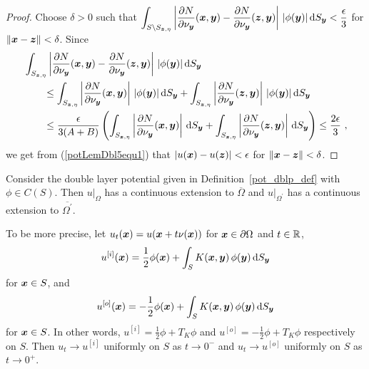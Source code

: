 \begin{proof}
Choose $\delta > 0$ such that
$\displaystyle
\int_{S \setminus S_{{\bm{z}},\eta}} \left| \frac{\partial{N}}{\partial \nu_{{\bm{y}}}}
({\bm{x}},{\bm{y}}) - \frac{\partial{N}}{\partial \nu_{{\bm{y}}}} ({\bm{z}},{\bm{y}})
\right|\,|\phi({\bm{y}})| \,\mathrm{d}{S}_{{\bm{y}}} < \frac{\epsilon}{3}$ for
$\|{\bm{x}} - {\bm{z}}\| < \delta$.
Since
\begin{align*}
&\int_{S_{{\bm{z}},\eta}}
\left| \frac{\partial{N}}{\partial \nu_{{\bm{y}}}} ({\bm{x}},{\bm{y}})
- \frac{\partial{N}}{\partial \nu_{{\bm{y}}}} ({\bm{z}},{\bm{y}}) \right|\,
|\phi({\bm{y}})| \,\mathrm{d}{S}_{{\bm{y}}} \\
& \qquad \leq \int_{S_{{\bm{z}},\eta}}
\left| \frac{\partial{N}}{\partial \nu_{{\bm{y}}}} ({\bm{x}},{\bm{y}}) \right|\,
|\phi({\bm{y}})| \,\mathrm{d}{S}_{{\bm{y}}} 
+ \int_{S_{{\bm{z}},\eta}}
\left| \frac{\partial{N}}{\partial \nu_{{\bm{y}}}} ({\bm{z}},{\bm{y}}) \right|\,
|\phi({\bm{y}})| \,\mathrm{d}{S}_{{\bm{y}}} \\
&\qquad \leq \frac{\epsilon}{3(A+B)} \left(
\int_{S_{{\bm{z}},\eta}}
\left| \frac{\partial{N}}{\partial \nu_{{\bm{y}}}} ({\bm{x}},{\bm{y}}) \right| \,\mathrm{d}{S}_{{\bm{y}}} 
+ \int_{S_{{\bm{z}},\eta}}
\left| \frac{\partial{N}}{\partial \nu_{{\bm{y}}}} ({\bm{z}},{\bm{y}}) \right| \,\mathrm{d}{S}_{{\bm{y}}}
\right)
\leq \frac{2\epsilon}{3} \ ,
\end{align*}
we get from (\ref{potLemDbl5equ1}) that
$|u({\bm{x}}) - u({\bm{z}})| < \epsilon$ for 
$\|{\bm{x}} - {\bm{z}}\| < \delta$.
\end{proof}

\begin{theorem} \label{pot_double_layer}
Consider the double layer potential given in
Definition~\ref{pot_dblp_def} with $\phi \in C(S)$.
Then $\displaystyle u\big|_\Omega$ has a continuous extension to
$\overline{\Omega}$ and $\displaystyle u\big|_{\Omega^{\prime}}$
has a continuous extension to $\displaystyle \overline{\Omega^{\prime}}$.

To be more precise, let
$\displaystyle u_t({\bm{x}}) = u({\bm{x}} + t \nu({\bm{x}}))$
for ${\bm{x}} \in \partial \Omega$ and $t \in \mathbb{R}$,
\begin{equation} \label{pot_dblpT1}
u^{[i]}({\bm{x}}) = \frac{1}{2} \phi({\bm{x}}) + \int_S
K({\bm{x}},{\bm{y}}) \, \phi({\bm{y}}) \,\mathrm{d}{S}_{{\bm{y}}}
\end{equation}
for ${\bm{x}} \in S$, and
\begin{equation} \label{pot_dblpT2}
u^{[o]}({\bm{x}}) = - \frac{1}{2} \phi({\bm{x}}) + \int_S
K({\bm{x}},{\bm{y}}) \, \phi({\bm{y}}) \,\mathrm{d}{S}_{{\bm{y}}}
\end{equation}
for ${\bm{x}} \in S$.
In other words, $\displaystyle u^{[i]} = \frac{1}{2} \phi + T_K \phi$ and
$\displaystyle u^{[o]} = -\frac{1}{2} \phi + T_K \phi$ respectively on $S$.
Then $u_t \rightarrow u^{[i]}$ uniformly on $S$ as $t\rightarrow 0^-$ and
$u_t \rightarrow u^{[o]}$ uniformly on $S$ as $t\rightarrow 0^+$.
\end{theorem}

